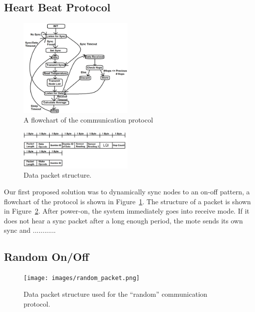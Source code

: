 \subsection{Heart Beat Protocol}
\label{section:heart_beat_protocol}

\begin{figure}[h!]
  \centering
  \includegraphics[width=0.5\textwidth]{images/algorithm_flowchart.png}
  \caption{A flowchart of the communication protocol
  \label{img:flowchart}
  }
\end{figure}

\begin{figure}[h!]
  \centering
  \includegraphics[width=0.5\textwidth]{images/data_packet.png}
  \caption{Data packet structure.
  \label{img:hb_packet}
  }
\end{figure}

Our first proposed solution was to dynamically sync nodes to an on-off pattern, a flowchart of the protocol is shown
in Figure~\ref{img:flowchart}.  The structure of a packet is shown in Figure~\ref{img:hb_packet}.  After power-on, the
system immediately goes into receive mode. If it does not hear a sync packet after a long enough period, the mote sends
its own sync and ............

\subsection{Random On/Off}
\label{section:random_dc}

\begin{figure}[h!]
  \centering
  \texttt{[image: images/random\_packet.png]}
  \caption{Data packet structure used for the ``random'' communication protocol.
  \label{img:rand_packet}
  }
\end{figure}

